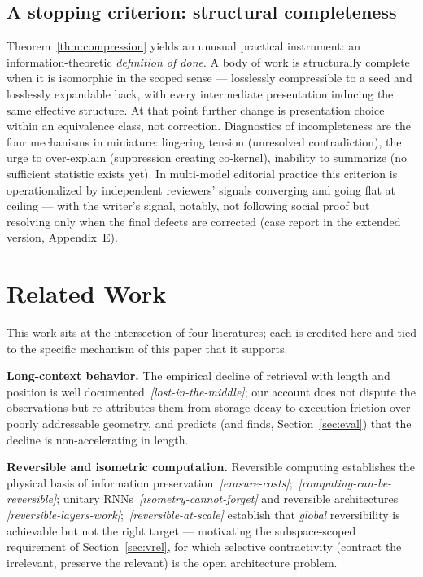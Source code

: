 \documentclass[11pt]{article}
\theoremstyle{remark}
\newif\ifslugs \slugstrue  %
\newcommand{\slug}[1]{\ifslugs\,{\small\textit{[#1]}}\fi}
\begin{document}
\subsection{A stopping criterion: structural completeness}
\label{sec:done}

Theorem~\ref{thm:compression} yields an unusual practical instrument: an
information-theoretic \emph{definition of done}. A body of work is structurally
complete when it is isomorphic in the scoped sense --- losslessly compressible to a
seed and losslessly expandable back, with every intermediate presentation inducing the
same effective structure. At that point further change is presentation choice within
an equivalence class, not correction. Diagnostics of incompleteness are the four
mechanisms in miniature: lingering tension (unresolved contradiction), the urge to
over-explain (suppression creating co-kernel), inability to summarize (no sufficient
statistic exists yet). In multi-model editorial practice this criterion is
operationalized by independent reviewers' signals converging and going flat at ceiling
--- with the writer's signal, notably, not following social proof but resolving only
when the final defects are corrected (case report in the extended version,
Appendix~E).

\section{Related Work}
\label{sec:related}

This work sits at the intersection of four literatures; each is credited here
and tied to the specific mechanism of this paper that it supports.

\textbf{Long-context behavior.} The empirical decline of retrieval with length and
position is well documented \citep{liu2024lost}\slug{lost-in-the-middle}; our account does not dispute the
observations but re-attributes them from storage decay to execution friction over
poorly addressable geometry, and predicts (and finds, Section~\ref{sec:eval}) that the
decline is non-accelerating in length.

\textbf{Reversible and isometric computation.} Reversible computing establishes the
physical basis of information preservation \citep{landauer1961}\slug{erasure-costs}; \citep{bennett1973}\slug{computing-can-be-reversible}; unitary
RNNs \citep{arjovsky2016unitary}\slug{isometry-cannot-forget} and reversible architectures
\citep{gomez2017reversible}\slug{reversible-layers-work}; \citep{kitaev2020reformer}\slug{reversible-at-scale} establish that \emph{global}
reversibility is achievable but not the right target --- motivating the
subspace-scoped requirement of Section~\ref{sec:vrel}, for which selective
contractivity (contract the irrelevant, preserve the relevant) is the open
architecture problem.
\end{document}
